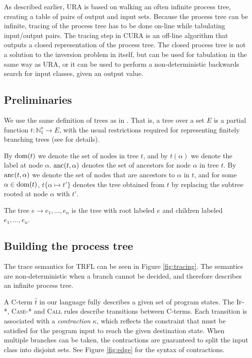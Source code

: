 \documentclass[10pt]{../sigplanconf}
\newcommand{\dom}{\ensuremath{{\rm dom}}}
\newcommand{\anc}{\ensuremath{{\rm anc}}}
\begin{document}
As described earlier, URA is based on walking an often infinite
process tree, creating a table of pairs of output and input
sets. Because the process tree can be infinite, tracing of the process
tree has to be done on-line while tabulating input/output pairs. The
tracing step in CURA is an off-line algorithm that outputs a closed
representation of the process tree. The closed process tree is not a
solution to the inversion problem in itself, but can be used for
tabulation in the same way as URA, or it can be used to perform a
non-deterministic backwards search for input classes, given an output
value.

\subsection{Preliminaries}
We use the same definition of trees as in
\cite{sorensen1998introduction}. That is, a tree over a set $E$ is a
partial function $t : \mathbb{N}_1^\star \rightarrow E$, with the
usual restrictions required for representing finitely branching trees
(see \cite{sorensen1998introduction}\cite{courcelle1983fundamental}
for details).

By $\dom(t)$ we denote the set of nodes in tree $t$, and by
$t(\alpha)$ we denote the label at node $\alpha$. ${\rm anc}(t,
\alpha)$ denotes the set of ancestors for node $\alpha$ in tree
$t$. By $\anc(t, \alpha)$ we denote the set of nodes that are
ancestors to $\alpha$ in $t$, and for some $\alpha \in \dom(t)$,
$t\{\alpha \mapsto t'\}$ denotes the tree obtained from $t$ by replacing
the subtree rooted at node $\alpha$ with $t'$.

The tree $e \rightarrow e_1, ..., e_n$ is the tree with root labeled
$e$ and children labeled $e_1, ..., e_n$.

\subsection{Building the process tree}
The trace semantics for TRFL can be seen in Figure
\ref{fig:tracing}. The semantics are non-deterministic when a branch
cannot be decided, and therefore describes an infinite process tree.

A C-term $\widehat{t}$ in our language fully describes a given set of
program states. The \textsc{If-*}, \textsc{Case-*} and \textsc{Call}
rules describe transitions between C-terms. Each transition is
associated with a \emph{contraction} $\kappa$, which reflects the
constraint that must be satisfied for the program input to reach the
given destination state. When multiple branches can be taken, the
contractions are guaranteed to split the input class into disjoint
sets. See Figure \ref{fig:edge} for the syntax of contractions.
\end{document}
